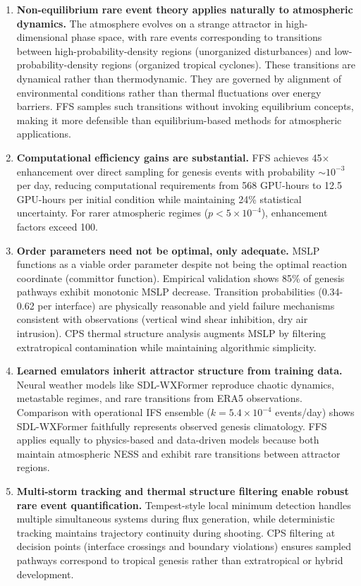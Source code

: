\documentclass[11pt]{article}
\begin{document}
\begin{enumerate}
    \item \textbf{Non-equilibrium rare event theory applies naturally to atmospheric dynamics.} The atmosphere evolves on a strange attractor in high-dimensional phase space, with rare events corresponding to transitions between high-probability-density regions (unorganized disturbances) and low-probability-density regions (organized tropical cyclones). These transitions are dynamical rather than thermodynamic. They are governed by alignment of environmental conditions rather than thermal fluctuations over energy barriers. FFS samples such transitions without invoking equilibrium concepts, making it more defensible than equilibrium-based methods for atmospheric applications.
    
    \item \textbf{Computational efficiency gains are substantial.} FFS achieves 45$\times$ enhancement over direct sampling for genesis events with probability $\sim 10^{-3}$ per day, reducing computational requirements from 568 GPU-hours to 12.5 GPU-hours per initial condition while maintaining 24\% statistical uncertainty. For rarer atmospheric regimes ($p < 5 \times 10^{-4}$), enhancement factors exceed 100.
    
    \item \textbf{Order parameters need not be optimal, only adequate.} MSLP functions as a viable order parameter despite not being the optimal reaction coordinate (committor function). Empirical validation shows 85\% of genesis pathways exhibit monotonic MSLP decrease. Transition probabilities (0.34-0.62 per interface) are physically reasonable and yield failure mechanisms consistent with observations (vertical wind shear inhibition, dry air intrusion). CPS thermal structure analysis augments MSLP by filtering extratropical contamination while maintaining algorithmic simplicity.
    
    \item \textbf{Learned emulators inherit attractor structure from training data.} Neural weather models like SDL-WXFormer reproduce chaotic dynamics, metastable regimes, and rare transitions from ERA5 observations. Comparison with operational IFS ensemble ($k = 5.4 \times 10^{-4}$ events/day) shows SDL-WXFormer faithfully represents observed genesis climatology. FFS applies equally to physics-based and data-driven models because both maintain atmospheric NESS and exhibit rare transitions between attractor regions.
    
    \item \textbf{Multi-storm tracking and thermal structure filtering enable robust rare event quantification.} Tempest-style local minimum detection handles multiple simultaneous systems during flux generation, while deterministic tracking maintains trajectory continuity during shooting. CPS filtering at decision points (interface crossings and boundary violations) ensures sampled pathways correspond to tropical genesis rather than extratropical or hybrid development.
\end{enumerate}
\end{document}
